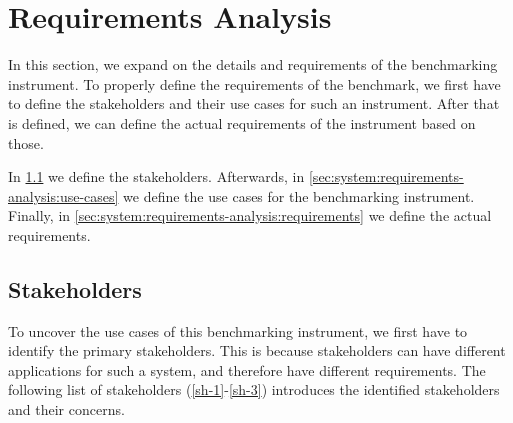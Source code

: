 \section{Requirements Analysis}
\label{sec:system:requirements-analysis}

In this section, we expand on the details and requirements of the benchmarking instrument. To properly define the requirements of the benchmark, we first have to define the stakeholders and their use cases for such an instrument. After that is defined, we can define the actual requirements of the instrument based on those.

In \cref{sec:system:requirements-analysis:stakeholders} we define the stakeholders. Afterwards, in \cref{sec:system:requirements-analysis:use-cases} we define the use cases for the benchmarking instrument. Finally, in \cref{sec:system:requirements-analysis:requirements} we define the actual requirements.


\subsection{Stakeholders}
\label{sec:system:requirements-analysis:stakeholders}

To uncover the use cases of this benchmarking instrument, we first have to identify the primary stakeholders. This is because stakeholders can have different applications for such a system, and therefore have different requirements. The following list of stakeholders (\ref{sh-1}-\ref{sh-3}) introduces the identified stakeholders and their concerns.

